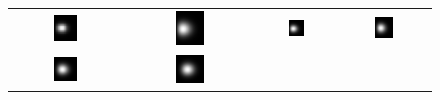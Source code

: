 \documentclass[acmsmall,review,anonymous]{acmart}\settopmatter{printfolios=true,printccs=false,printacmref=false}
\begin{document}
\begin{figure}
\begin{tabular}{cccc}
\includegraphics[width=0.23\textwidth]{images/true-field-t=50} & 
\includegraphics[width=0.23\textwidth]{images/true-field-t=641} &
\includegraphics[width=0.23\textwidth]{images/true-field-t=1232} & 
\includegraphics[width=0.23\textwidth]{images/true-field-t=1823} \\
\includegraphics[width=0.23\textwidth]{images/true-field-t=2414} & 
\includegraphics[width=0.23\textwidth]{images/true-field-t=3006} &

\end{tabular}
\end{figure}
\end{document}
